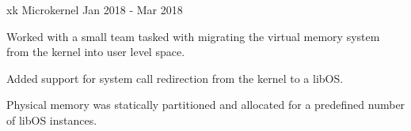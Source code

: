 
\begin{cvskills}
    \cvproject
        {xk Microkernel}
        {Jan 2018 - Mar 2018}
        {\begin{cvitems} %
            \item{
                Worked with a small team tasked with migrating the virtual memory
                system from the kernel into user level space.
            }
            \item{Added support for system call redirection from the kernel to a libOS.}
            \item{Physical memory was statically partitioned and allocated for a predefined number of libOS instances.}
        \end{cvitems}}
\end{cvskills}
